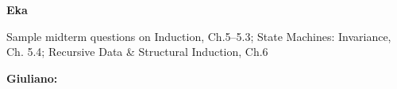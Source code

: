 \documentclass[quiz]{mcs}
\begin{document}

\renewcommand{\exampreamble}{   %
  \begin{tabular}{l}
    \textbf{Circle your}\quad   \teaminfo
  \end{tabular}

  \begin{itemize}

  \item
   This exam is \textbf{closed book} except for a 2-sided cribsheet.
   Total time is 55 minutes. 

  \item
   Write your solutions in the space provided.  If you need more
   space, write on the back of the sheet containing the problem.

   
   \item In answering the following questions, you may use without
     proof any of the results from class or text.

\iffalse
  \item
   GOOD LUCK!
\fi

  \end{itemize}}

\textbf{Eka}

\begin{staffnotes}
Sample midterm questions on Induction, Ch.5--5.3; State Machines: Invariance, Ch. 5.4; Recursive Data \& Structural Induction, Ch.6
\end{staffnotes}


{}

{}

\examspace
\textbf{Giuliano:}



\end{document}
